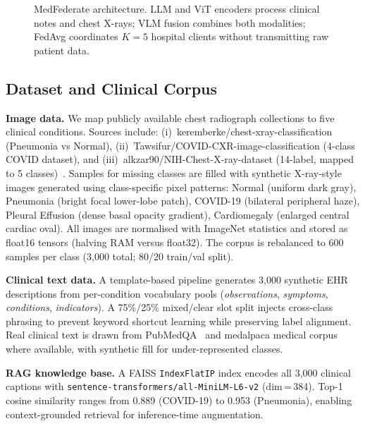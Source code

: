 \documentclass[conference]{IEEEtran}
\begin{document}
\begin{figure}[t]
{%
}
\caption{MedFederate architecture. LLM and ViT encoders process clinical
notes and chest X-rays; VLM fusion combines both modalities; FedAvg
coordinates $K{=}5$ hospital clients without transmitting raw patient data.}
\label{fig:arch}
\end{figure}

\subsection{Dataset and Clinical Corpus}

\textbf{Image data.}
We map publicly available chest radiograph collections to five clinical
conditions. Sources include: (i)~keremberke/chest-xray-classification
(Pneumonia vs Normal), (ii)~Tawsifur/COVID-CXR-image-classification
(4-class COVID dataset), and (iii)~alkzar90/NIH-Chest-X-ray-dataset
(14-label, mapped to 5 classes)~\cite{Wang2017nih}. Samples for missing classes are filled with
synthetic X-ray-style images generated using class-specific pixel patterns:
Normal (uniform dark gray), Pneumonia (bright focal lower-lobe patch),
COVID-19 (bilateral peripheral haze), Pleural Effusion (dense basal
opacity gradient), Cardiomegaly (enlarged central cardiac oval).
All images are normalised with ImageNet statistics and stored as
float16 tensors (halving RAM versus float32). The corpus is rebalanced
to 600 samples per class (3{,}000 total; 80/20 train/val split).

\textbf{Clinical text data.}
A template-based pipeline generates 3{,}000 synthetic EHR descriptions
from per-condition vocabulary pools (\textit{observations},
\textit{symptoms}, \textit{conditions}, \textit{indicators}). A
75\%/25\% mixed/clear slot split injects cross-class phrasing to
prevent keyword shortcut learning while preserving label alignment.
Real clinical text is drawn from PubMedQA~\cite{qiaojin2019pubmedqa}
and medalpaca medical corpus where available, with synthetic fill for
under-represented classes.

\textbf{RAG knowledge base.}
A FAISS \texttt{IndexFlatIP} index encodes all 3{,}000 clinical captions
with \texttt{sentence-transformers/all-MiniLM-L6-v2}
(dim\,=\,384). Top-1 cosine similarity ranges from 0.889 (COVID-19)
to 0.953 (Pneumonia), enabling context-grounded retrieval for
inference-time augmentation.
\end{document}
